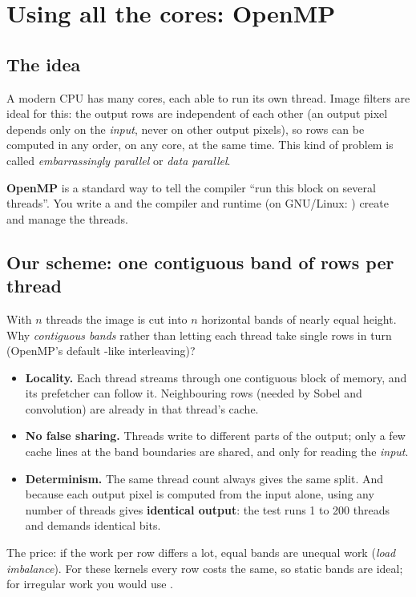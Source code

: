 \chapter{Using all the cores: OpenMP}\label{ch:openmp}

\section{The idea}

A modern CPU has many cores, each able to run its own thread. Image filters are ideal for this: the output rows are independent of each other (an output pixel depends only on the \emph{input}, never on other output pixels), so rows can be computed in any order, on any core, at the same time. This kind of problem is called \emph{embarrassingly parallel} or \emph{data parallel}.

\textbf{OpenMP} is a standard way to tell the compiler ``run this block on several threads''. You write a  and the compiler and runtime (on GNU/Linux: ) create and manage the threads.

\section{Our scheme: one contiguous band of rows per thread}



With $n$ threads the image is cut into $n$ horizontal bands of nearly equal height. Why \emph{contiguous bands} rather than letting each thread take single rows in turn (OpenMP's default -like interleaving)?
\begin{itemize}
\item \textbf{Locality.} Each thread streams through one contiguous block of memory, and its prefetcher can follow it. Neighbouring rows (needed by Sobel and convolution) are already in that thread's cache.
\item \textbf{No false sharing.} Threads write to different parts of the output; only a few cache lines at the band boundaries are shared, and only for reading the \emph{input}.
\item \textbf{Determinism.} The same thread count always gives the same split. And because each output pixel is computed from the input alone, using any number of threads gives \textbf{identical output}: the test  runs 1 to 200 threads and demands identical bits.
\end{itemize}
The price: if the work per row differs a lot, equal bands are unequal work (\emph{load imbalance}). For these kernels every row costs the same, so static bands are ideal; for irregular work you would use .


